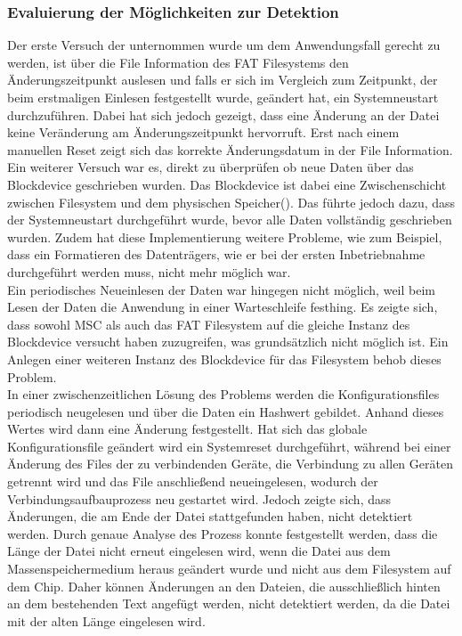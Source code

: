 \subsubsection{Evaluierung der Möglichkeiten zur Detektion}
Der erste Versuch der unternommen wurde um dem Anwendungsfall gerecht zu werden, ist über die File Information des \ac{FAT} Filesystems den Änderungszeitpunkt auslesen und falls er sich im Vergleich zum Zeitpunkt, der beim erstmaligen Einlesen festgestellt wurde, geändert hat, ein Systemneustart durchzuführen. Dabei hat sich jedoch gezeigt, dass eine Änderung an der Datei keine Veränderung am Änderungszeitpunkt hervorruft. Erst nach einem manuellen Reset zeigt sich das korrekte Änderungsdatum in der File Information. \\
Ein weiterer Versuch war es, direkt zu überprüfen ob neue Daten über das Blockdevice geschrieben wurden. Das Blockdevice ist dabei eine Zwischenschicht zwischen Filesystem und dem physischen Speicher(\cite{NRF_Block_device}). Das führte jedoch dazu, dass der Systemneustart durchgeführt wurde, bevor alle Daten vollständig geschrieben wurden. Zudem hat diese Implementierung weitere Probleme, wie zum Beispiel, dass ein Formatieren des Datenträgers, wie er bei der ersten Inbetriebnahme durchgeführt werden muss, nicht mehr möglich war. \\
Ein periodisches Neueinlesen der Daten war hingegen nicht möglich, weil beim Lesen der Daten die Anwendung in einer Warteschleife festhing. Es zeigte sich, dass sowohl \ac{MSC} als auch das \ac{FAT} Filesystem auf die gleiche Instanz des Blockdevice versucht haben zuzugreifen, was grundsätzlich nicht möglich ist. Ein Anlegen einer weiteren Instanz des Blockdevice für das Filesystem behob dieses Problem. \\
In einer zwischenzeitlichen Lösung des Problems werden die Konfigurationsfiles periodisch neugelesen und über die Daten ein Hashwert gebildet. Anhand dieses Wertes wird dann eine Änderung festgestellt. Hat sich das globale Konfigurationsfile geändert wird ein Systemreset durchgeführt, während bei einer Änderung des Files der zu verbindenden Geräte, die Verbindung zu allen Geräten getrennt wird und das File anschließend neueingelesen, wodurch der Verbindungsaufbauprozess neu gestartet wird. Jedoch zeigte sich, dass Änderungen, die am Ende der Datei stattgefunden haben, nicht detektiert werden. Durch genaue Analyse des Prozess konnte festgestellt werden, dass die Länge der Datei nicht erneut eingelesen wird, wenn die Datei aus dem Massenspeichermedium heraus geändert wurde und nicht aus dem Filesystem auf dem Chip. Daher können Änderungen an den Dateien, die ausschließlich hinten an dem bestehenden Text angefügt werden, nicht detektiert werden, da die Datei mit der alten Länge eingelesen wird.

